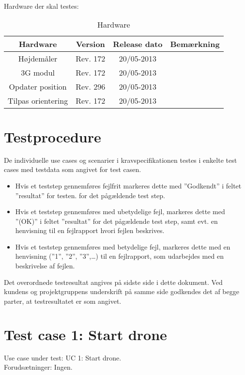 Hardware der skal testes:
\begin{table}[H]
	\centering
		\begin{tabular}{|c|c|c|c|}
			\hline
			Hardware & Version & Release dato & Bemærkning \\ \hline
			Højdemåler & Rev. 172 & 20/05-2013 &  \\ \hline
			3G modul & Rev. 172 & 20/05-2013 &  \\ \hline
			Opdater position & Rev. 296 & 20/05-2013 &  \\ \hline
			Tilpas orientering & Rev. 172 & 20/05-2013 &  \\ \hline
		\end{tabular}
	\caption{Hardware}
\end{table}


\section*{Testprocedure}
De individuelle use cases og scenarier i kravspecifikationen testes i enkelte test cases med testdata som angivet for test casen. 

\begin{itemize}
	\item Hvis et teststep gennemføres fejlfrit markeres dette med ”Godkendt” i feltet ”resultat” for testen. for det pågældende test step.

	\item Hvis et teststep gennemføres med ubetydelige fejl, markeres dette med ”(OK)” i feltet ”resultat” for det pågældende test step, samt evt. en henvisning til en fejlrapport hvori fejlen beskrives.
	
	\item Hvis et teststep gennemføres med betydelige fejl, markeres dette med en henvisning (”1”, ”2”, ”3”,…) til en fejlrapport, som udarbejdes med en beskrivelse af fejlen.
	
\end{itemize}
Det overordnede testresultat angives på sidste side i dette dokument. Ved kundens og projektgruppens underskrift på samme side godkendes det af begge parter, at testresultatet er som angivet.

\newpage

\section{Test case 1: Start drone}
Use case under test: UC 1: Start drone.\\
Forudsætninger:	Ingen.

